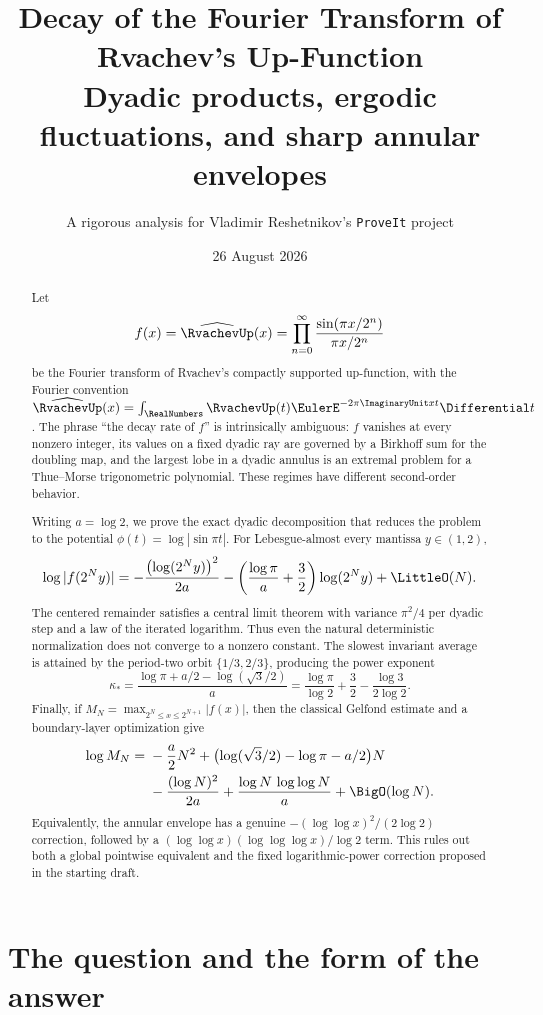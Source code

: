 \documentclass[11pt,oneside]{article}
\title{\bfseries Decay of the Fourier Transform of Rvachev's Up-Function\\[0.35em]
\large Dyadic products, ergodic fluctuations, and sharp annular envelopes}
\author{A rigorous analysis for Vladimir Reshetnikov's \texttt{ProveIt} project}
\date{26 August 2026}
\theoremstyle{definition}
\theoremstyle{remark}
\begin{document}
\maketitle

\begin{abstract}
Let
\[
 f(x)=\widehat{\RvachevUp}(x)
 =\prod_{n=0}^{\infty}\frac{\sin(\pi x/2^n)}{\pi x/2^n}
\]
be the Fourier transform of Rvachev's compactly supported up-function, with the
Fourier convention $\widehat{\RvachevUp}(x)=\int_{\RealNumbers}\RvachevUp(t)\EulerE^{-2\pi\ImaginaryUnit xt}\Differential t$.
The phrase ``the decay rate of $f$'' is intrinsically ambiguous: $f$ vanishes at
every nonzero integer, its values on a fixed dyadic ray are governed by a
Birkhoff sum for the doubling map, and the largest lobe in a dyadic annulus is
an extremal problem for a Thue--Morse trigonometric polynomial.  These regimes
have different second-order behavior.

Writing $a=\log 2$, we prove the exact dyadic decomposition that reduces the
problem to the potential $\phi(t)=\log|\sin\pi t|$.  For Lebesgue-almost every
mantissa $y\in(1,2)$,
\[
 \log|f(2^Ny)|
 =-\frac{\bigl(\log(2^Ny)\bigr)^2}{2a}
  -\left(\frac{\log\pi}{a}+\frac32\right)\log(2^Ny)
  +\LittleO(N).
\]
The centered remainder satisfies a central limit theorem with variance
$\pi^2/4$ per dyadic step and a law of the iterated logarithm.  Thus even the
natural deterministic normalization does not converge to a nonzero constant.
The slowest invariant average is attained by the period-two orbit
$\{1/3,2/3\}$, producing the power exponent
\[
 \kappa_*=\frac{\log\pi+a/2-\log(\sqrt3/2)}{a}
 =\frac{\log\pi}{\log2}+\frac32-\frac{\log3}{2\log2}.
\]
Finally, if
$M_N=\max_{2^N\le x\le2^{N+1}}|f(x)|$, then the classical Gelfond estimate and
a boundary-layer optimization give
\[
 \begin{split}
 \log M_N={}&-\frac a2N^2
 +\bigl(\log(\sqrt3/2)-\log\pi-a/2\bigr)N\\
 &-\frac{(\log N)^2}{2a}
 +\frac{\log N\,\log\log N}{a}
 +\BigO(\log N).
 \end{split}
\]
Equivalently, the annular envelope has a genuine
$-(\log\log x)^2/(2\log2)$ correction, followed by a
$(\log\log x)(\log\log\log x)/\log2$ term.  This rules out both a global
pointwise equivalent and the fixed logarithmic-power correction proposed in
the starting draft.
\end{abstract}

\tableofcontents
\newpage

\section{The question and the form of the answer}
\end{document}
